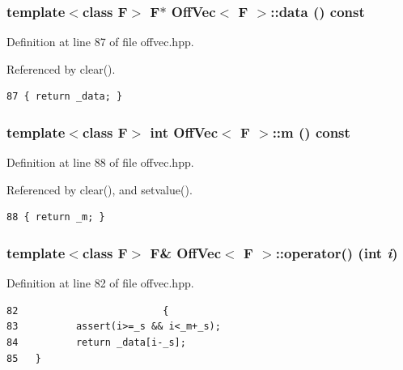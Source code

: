 \subsubsection{\setlength{\rightskip}{0pt plus 5cm}template$<$class F$>$ F$\ast$ {\bf Off\-Vec}$<$ F $>$::data () const\hspace{0.3cm}{\tt  [inline]}}\label{classOffVec_ad3b2b9598c8547b4f7afe7a79ed520c_ad3b2b9598c8547b4f7afe7a79ed520c}




Definition at line 87 of file offvec.hpp.

Referenced by clear().

\footnotesize\begin{verbatim}87 { return _data; }
\end{verbatim}\normalsize 


\subsubsection{\setlength{\rightskip}{0pt plus 5cm}template$<$class F$>$ int {\bf Off\-Vec}$<$ F $>$::m () const\hspace{0.3cm}{\tt  [inline]}}\label{classOffVec_6a2fa69c25bf8ed36e019d0fb3f5e966_6a2fa69c25bf8ed36e019d0fb3f5e966}




Definition at line 88 of file offvec.hpp.

Referenced by clear(), and setvalue().

\footnotesize\begin{verbatim}88 { return _m; }
\end{verbatim}\normalsize 


\subsubsection{\setlength{\rightskip}{0pt plus 5cm}template$<$class F$>$ F\& {\bf Off\-Vec}$<$ F $>$::operator() (int {\em i})\hspace{0.3cm}{\tt  [inline]}}\label{classOffVec_a6859783df5149b240b538ed4f692366_a6859783df5149b240b538ed4f692366}




Definition at line 82 of file offvec.hpp.

\footnotesize\begin{verbatim}82                         {
83          assert(i>=_s && i<_m+_s);
84          return _data[i-_s]; 
85   }
\end{verbatim}\normalsize 


